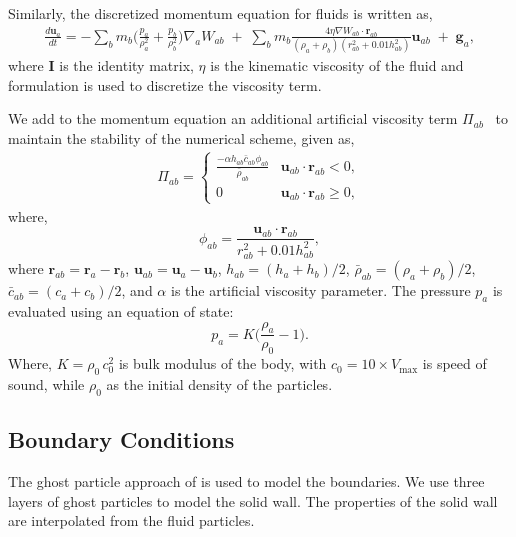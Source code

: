 \documentclass[preprint,12pt]{elsarticle}
\newcommand{\ten}[1]{\ensuremath{\mathbf{#1}}}
\begin{document}
%
Similarly, the discretized momentum equation for fluids is written as,
\begin{multline}
  \label{eq:sph-momentum-fluid}
  \frac{{d}\ten{u}_{a}}{dt} = - \sum_{b} m_b
  \bigg(\frac{p_a}{\rho_a^2} + \frac{p_b}{\rho_b^2}\bigg)
  \nabla_{a} W_{ab}
 \;+\;
  \sum_{b} m_b \frac{4 \eta \nabla W_{ab}\cdot
    \ten{r}_{ab}}{(\rho_a + \rho_b) (r_{ab}^2 + 0.01 h_{ab}^2)} \ten{u}_{ab}  \;+\;
  \ten{g}_{a},
\end{multline}
where $\ten{I}$ is the identity matrix, $\eta$ is the kinematic viscosity of the
fluid and \cite{morris1997modeling} formulation is used to discretize the
viscosity term.

We add to the momentum equation an additional artificial viscosity term
$\Pi_{ab}$~\cite{monaghan-review:2005} to maintain the stability of the
numerical scheme, given as,
\begin{align}
  \label{eq:mom-av}
  \Pi_{ab} =
  \begin{cases}
\frac{-\alpha h_{ab} \bar{c}_{ab} \phi_{ab}}{\bar{\rho}_{ab}}
  & \ten{u}_{ab}\cdot \ten{r}_{ab} < 0, \\
  0 & \ten{u}_{ab}\cdot \ten{r}_{ab} \ge 0,
\end{cases}
\end{align}
where,
%
\begin{equation}
  \label{eq:av-phiij}
  \phi_{ab} = \frac{\ten{u}_{ab} \cdot \ten{r}_{ab}}{r^2_{ab} + 0.01 h^2_{ab}},
\end{equation}
%
where $\ten{r}_{ab} = \ten{r}_a - \ten{r}_b$,
$\ten{u}_{ab} = \ten{u}_a - \ten{u}_b$, $h_{ab} = (h_a + h_b)/2$,
$\bar{\rho}_{ab} = (\rho_a + \rho_b)/2$, $\bar{c}_{ab} = (c_a + c_b) / 2$, and
$\alpha$ is the artificial viscosity parameter.  The pressure $p_a$ is evaluated
using an equation of state:
\begin{equation}
\label{eqn:sph-eos}
  p_a = K \bigg(\frac{\rho_a}{\rho_{0}} - 1 \bigg).
\end{equation}
Where, $K=\rho_0 \, c_0^2$ is bulk modulus of the body, with
$c_0=10 \times V_{\text{max}}$ is speed of sound, while $\rho_0$ as the
initial density of the particles.


\FloatBarrier%
\subsection{Boundary Conditions}
\label{sec:boundary_conditions}

The ghost particle approach of \cite{Adami2012} is used to model the
boundaries. We use three layers of ghost particles to model the solid wall.
The properties of the solid wall are interpolated from the fluid particles.
\end{document}

